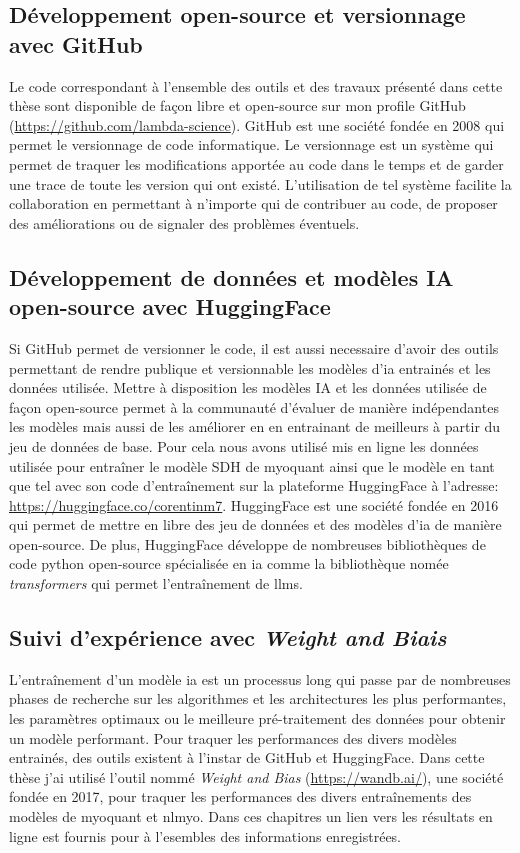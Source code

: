 \subsection{Développement open-source et versionnage avec GitHub}
Le code correspondant à l'ensemble des outils et des travaux présenté dans cette thèse sont disponible de façon libre et open-source sur mon profile GitHub (\href{https://github.com/lambda-science}{https://github.com/lambda-science}). GitHub est une société fondée en 2008 qui permet le versionnage de code informatique. Le versionnage est un système qui permet de traquer les modifications apportée  au code dans le temps et de garder une trace de toute les version qui ont existé. L'utilisation de tel système facilite la collaboration en permettant à n'importe qui de contribuer au code, de proposer des améliorations ou de signaler des problèmes éventuels.

\subsection{Développement de données et modèles IA open-source avec HuggingFace}
Si GitHub permet de versionner le code, il est aussi necessaire d'avoir des outils permettant de rendre publique et versionnable les modèles d'\gls{ia} entrainés et les données utilisée. Mettre à disposition les modèles IA et les données utilisée de façon open-source permet à la communauté d'évaluer de manière indépendantes les modèles mais aussi de les améliorer en en entrainant de meilleurs à partir du jeu de données de base. Pour cela nous avons utilisé mis en ligne les données utilisée pour entraîner le modèle SDH de \gls{myoquant} ainsi que le modèle en tant que tel avec son code d'entraînement sur la plateforme HuggingFace à l'adresse: \href{https://huggingface.co/corentinm7}{https://huggingface.co/corentinm7}. HuggingFace est une société fondée en 2016 qui permet de mettre en libre des jeu de données et des modèles d'\gls{ia} de manière open-source. De plus, HuggingFace développe de nombreuses bibliothèques de code python open-source spécialisée en \gls{ia} comme la bibliothèque nomée \textit{transformers} qui permet l'entraînement de \gls{llms}.

\subsection{Suivi d'expérience avec \textit{Weight and Biais}}
L'entraînement d'un modèle \gls{ia} est un processus long qui passe par de nombreuses phases de recherche sur les algorithmes et les architectures les plus performantes, les paramètres optimaux ou le meilleure pré-traitement des données pour obtenir  un modèle performant. Pour traquer les performances des divers modèles entrainés, des outils existent à l'instar de GitHub et HuggingFace. Dans cette thèse j'ai utilisé l'outil nommé \textit{Weight and Bias} (\href{https://wandb.ai/}{https://wandb.ai/}), une société fondée en 2017, pour traquer les performances des divers entraînements des modèles de \gls{myoquant} et \gls{nlmyo}. Dans ces chapitres un lien vers les résultats en ligne est fournis pour à l'esembles des informations enregistrées.

